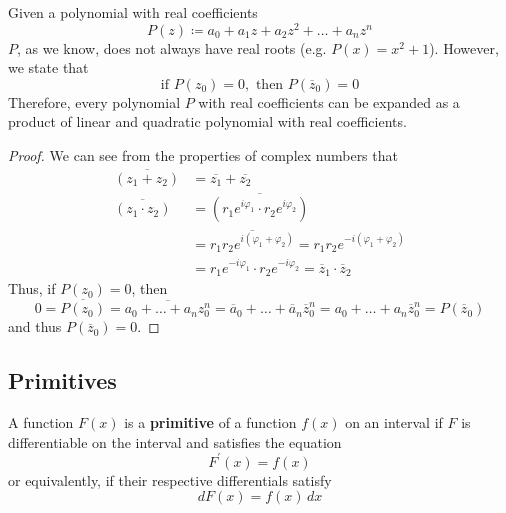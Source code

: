     \begin{corollary}
      \label{thm:complex-conjugate-roots-of-real-polynomials}
    Given a polynomial with real coefficients
    \begin{equation}
      P(z) \coloneqq a_0 + a_1 z + a_2 z^2 + \ldots + a_n z^n
    \end{equation}
    $P$, as we know, does not always have real roots (e.g. $P(x) = x^2 + 1$). However, we state that
    \begin{equation}
      \text{if } P(z_0) = 0, \text{ then } P(\overline{z}_0) = 0
    \end{equation}
    Therefore, every polynomial $P$ with real coefficients can be expanded as a product of linear and quadratic polynomial with real coefficients. 
    \end{corollary}
    \begin{proof}
    We can see from the properties of complex numbers that
    \begin{align*}
        \overline{(z_1 + z_2)} & = \overline{z_1} + \overline{z_2} \\
        \overline{(z_1 \cdot z_2)} & = \overline{(r_1 e^{i \varphi_1} \cdot r_2 e^{i \varphi_2})} \\
        & = \overline{r_1 r_2 e^{i(\varphi_1 + \varphi_2)}} = r_1 r_2 e^{-i(\varphi_1 + \varphi_2)} \\
        & = r_1 e^{-i\varphi_1} \cdot r_2 e^{-i \varphi_2} = \overline{z}_1 \cdot \overline{z}_2
    \end{align*}
    Thus, if $P(z_0) = 0$, then 
    \begin{equation}
      0 = \overline{P(z_0)} = \overline{a_0 + \ldots + a_n z_0^n} = \overline{a}_0 + \ldots + \overline{a}_n \overline{z}_0^n  = a_0 + \ldots + a_n \overline{z}_0^n = P(\overline{z}_0)
    \end{equation}
    and thus $P(\overline{z}_0) = 0$. 
    \end{proof}

  \subsection{Primitives}

    \begin{definition}[Primitive]
      \label{def:primitive}
      A function $F(x)$ is a \textbf{primitive} of a function $f(x)$ on an interval if $F$ is differentiable on the interval and satisfies the equation 
      \begin{equation}
        F^\prime (x) = f(x)
      \end{equation}
      or equivalently, if their respective differentials satisfy
      \begin{equation}
        d F(x) = f(x) \,dx
      \end{equation}
    \end{definition}

